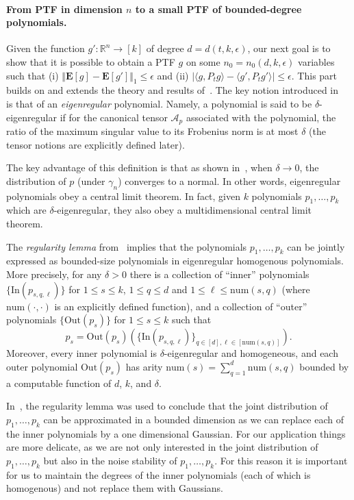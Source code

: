 \documentclass{toc}
\newcommand{\Inner}{\mathrm{In}}
\newcommand{\Outer}{\mathrm{Out}}
\newcommand{\num}{\mathrm{num}}
\begin{document}
\paragraph{From PTF in dimension $n$ to a small PTF of
%
bounded-degree    %
polynomials.}   

Given the function $g': \mathbb{R}^n \rightarrow [k]$ of degree $d= d( t, k, \epsilon)$, our next goal is to show  that it is possible to obtain a PTF $g$ on some $n_0 = n_0 (d, k, \epsilon)$ variables such that (i) $\Vert \mathbf{E}[g] - \mathbf{E}[g'] \Vert_1 \le \epsilon$ and (ii) $|\langle g, P_t g \rangle - \langle g', P_t g' \rangle| \le \epsilon$. This part builds on and extends the theory and results of~\cite{DS14}. The key notion introduced in~\cite{DS14} is that of an \emph{eigenregular} polynomial. Namely, a polynomial is said to be $\delta$-eigenregular if for the canonical tensor $\mathcal{A}_p$ associated with the polynomial, the ratio of  the maximum singular value to its Frobenius norm is at most $\delta$ (the tensor notions are explicitly defined later). 

  The key advantage of this definition is that as shown in~\cite{DS14}, when $\delta \rightarrow 0$, the distribution of $p$ (under $\gamma_n$) converges to a normal.  In other words, eigenregular polynomials obey a central limit theorem.  In fact, given $k$ polynomials $p_1, \ldots, p_k$ which are $\delta$-eigenregular, they also obey a multidimensional central limit theorem.  
  
The \emph{regularity lemma} from~\cite{DS14} implies that the polynomials
$p_1,\ldots,p_k$ can be jointly expressed as bounded-size
polynomials in eigenregular homogenous polynomials. More precisely,
for any $\delta > 0$ there is a collection of ``inner'' polynomials
$\{\Inner(p_{s, q, \ell })\}$ for $1 \le s \le k$, $1 \le q \le d$ and $1 \le
\ell \le \num(s,q)$ (where $\num(\cdot, \cdot)$ is an explicitly defined
function), and a collection of ``outer'' polynomials $\{\Outer(p_s)\}$
for $1 \le s \le k$ such that
\[
    p_s = \Outer(p_s) (\{\Inner(p_{s,q, \ell})\}_{q \in [d], \ell \in [\num(s,q)]}).
\]
Moreover, every inner polynomial is $\delta$-eigenregular and homogeneous, and
each outer polynomial $\Outer(p_s)$ has arity
$\num(s) = \sum_{q=1}^d \num(s,q)$
bounded by a computable function of $d$, $k$, and $\delta$.

In~\cite{DS14}, the regularity lemma was used to conclude that the joint
distribution of $p_1,\ldots,p_k$ can be approximated in a bounded dimension as
we can replace each of the inner polynomials by a one dimensional Gaussian. For
our application things are more delicate, as we are not only interested in the
joint distribution of $p_1,\ldots,p_k$ but also in the noise stability of
$p_1,\ldots,p_k$.  For this reason it is important for us to maintain the
degrees of the inner polynomials (each of which is homogenous) and not replace
them with Gaussians.
\end{document}
